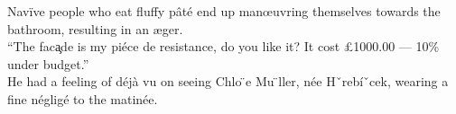 \documentclass[12pt,a4paper]{article}
\begin{document}
Nav\"{i}ve people who eat fluffy p\^{a}t\'{e} end up man\oe uvring themselves towards the bathroom, resulting in an \ae ger.\\
“The fac\c{a}de is my pi\'{e}ce de resistance, do you like it? It cost \pounds 1000.00 — 10\% under budget.”\\
He had a feeling of déjà vu on seeing Chlo ̈e Mu ̈ller, née Hˇrebíˇcek, wearing a fine négligé
to the matinée.
\end{document}
